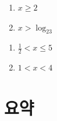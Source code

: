 \documentclass{oblivoir}
\begin{document}
\begin{multicols*}{2}
%
\begin{enumerate}
\item
\(x\ge2\)
\item
\(x>\log_23\)
\end{enumerate}

%
\begin{enumerate}
\item
\(\frac12<x\le5\)
\item
\(1<x<4\)
\end{enumerate}
\end{multicols*}

%
\section*{요약}
\end{document}
